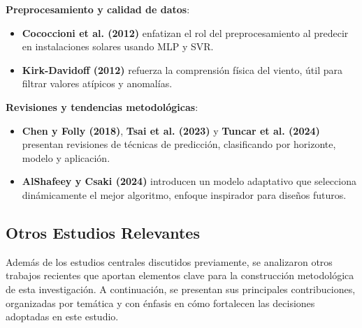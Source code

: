 \documentclass[conference]{IEEEtran}
\begin{document}
\textbf{Preprocesamiento y calidad de datos}:
\begin{itemize}[leftmargin=*,itemsep=1pt]

\item \textbf{Cococcioni et al. (2012)} enfatizan el rol del preprocesamiento al predecir en instalaciones solares usando MLP y SVR.

\item \textbf{Kirk-Davidoff (2012)} refuerza la comprensión física del viento, útil para filtrar valores atípicos y anomalías.

\end{itemize}
	
\textbf{Revisiones y tendencias metodológicas}:
\begin{itemize}[leftmargin=*,itemsep=1pt]

\item \textbf{Chen y Folly (2018)}, \textbf{Tsai et al. (2023)} y \textbf{Tuncar et al. (2024)} presentan revisiones de técnicas de predicción, clasificando por horizonte, modelo y aplicación.

\item \textbf{AlShafeey y Csaki (2024)} introducen un modelo adaptativo que selecciona dinámicamente el mejor algoritmo, enfoque inspirador para diseños futuros.

\end{itemize}
	
\subsection{Otros Estudios Relevantes}
	
Además de los estudios centrales discutidos previamente, se analizaron otros trabajos recientes que aportan elementos clave para la construcción metodológica de esta investigación. A continuación, se presentan sus principales contribuciones, organizadas por temática y con énfasis en cómo fortalecen las decisiones adoptadas en este estudio.
	
\end{document}
